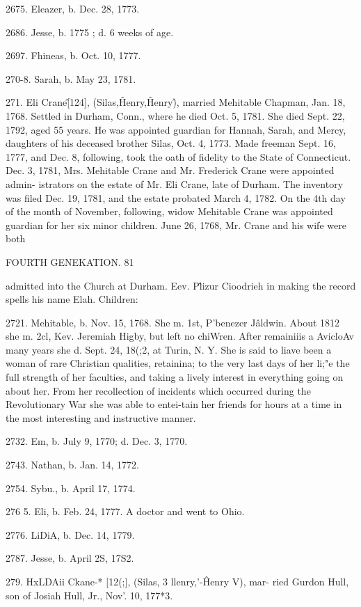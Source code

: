 \documentclass{book}
\begin{document}
2675. Eleazer, b. Dec. 28, 1773. 

2686. Jesse, b. 1775 ; d. 6 weeks of age. 

2697. Fhineas, b. Oct. 10, 1777. 

270-8. Sarah, b. May 23, 1781. 

271. Eli Crane\^ [124], (Silas,\^ Henry,\^ Henry\^), married 
Mehitable Chapman, Jan. 18, 1768. Settled in Durham, Conn., 
where he died Oct. 5, 1781. She died Sept. 22, 1792, aged 55 
years. He was appointed guardian for Hannah, Sarah, and 
Mercy, daughters of his deceased brother Silas, Oct. 4, 1773. 
Made freeman Sept. 16, 1777, and Dec. 8, following, took the 
oath of fidelity to the State of Connecticut. Dec. 3, 1781, Mrs. 
Mehitable Crane and Mr. Frederick Crane were appointed admin- 
istrators on the estate of Mr. Eli Crane, late of Durham. The 
inventory was filed Dec. 19, 1781, and the estate probated March 
4, 1782. On the 4th day of the month of November, following, 
widow Mehitable Crane was appointed guardian for her six minor 
children. June 26, 1768, Mr. Crane and his wife were both 



FOURTH GENEKATION. 81 

admitted into the Church at Durham. Eev. P\^lizur Cioodrieh in 
making the record spells his name Elah. Children: 

2721. Mehitable, b. Nov. 15, 1768. She m. 1st, P'benezer J\^aldwin. 
About 1812 she m. 2cl, Kev. Jeremiah Higby, but left no 
chiWren. After remainiiis a AvicloAv many years she d. Sept. 
24, 18(;2, at Turin, N. Y. She is said to liave been a woman 
of rare Christian qualities, retainina; to the very last days 
of her li;"e the full strength of her faculties, and taking a 
lively interest in everything going on about her. From 
her recollection of incidents which occurred during the 
Revolutionary War she was able to entei-tain her friends 
for hours at a time in the most interesting and instructive 
manner. 

2732. Em, b. July 9, 1770; d. Dec. 3, 1770. 

2743. Nathan, b. Jan. 14, 1772. 

2754. Sybu., b. April 17, 1774. 

276  5. Eli, b. Feb. 24, 1777. A doctor and went to Ohio. 

2776. LiDiA, b. Dec. 14, 1779. 

2787. Jesse, b. April 2S, 17S2. 

279. HxLDAii Ckane-* [12(;], (Silas, 3 llenry,'-\^ Henry V), mar- 
ried Gurdon Hull, son of Josiah Hull, Jr., Nov'. 10, 177*3. 
\end{document}
